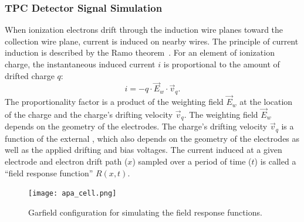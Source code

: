 \subsubsection{TPC Detector Signal Simulation}\label{sec:tpc_sim}

When ionization electrons drift through the induction wire planes toward the collection wire plane, current is
induced on nearby wires. The principle of current induction is described by the Ramo theorem~\cite{Shockley1938,Ramo:1939vr}. 
For an element of ionization charge, the instantaneous induced current $i$ is proportional to the amount of drifted charge $q$: 
\begin{equation}\label{eq:shockley_ramo}
  i = - q \cdot \vec{E}_w \cdot \vec{v}_q.
\end{equation}
The proportionality factor is a product of the weighting field $\vec{E}_w$ at the location of the charge and 
the charge's drifting velocity $\vec{v}_q$. The weighting field $\vec{E}_w$ depends on the geometry of 
the electrodes. The charge's drifting velocity $\vec{v}_q$ is a function of the external \efield, which 
also depends on the geometry of the electrodes as well as the applied drifting and bias voltages. The current induced at a given electrode and electron drift path ($x$)
  sampled over a period of time ($t$) is called a ``field response function'' $R(x,t)$.

\begin{figure}[!htp]
\centering
\texttt{[image: apa\_cell.png]}
\caption[Garfield configuration for simulating the field response functions]{Garfield configuration for simulating the field response functions.}
\label{field_resp_geometry}
\end{figure}

